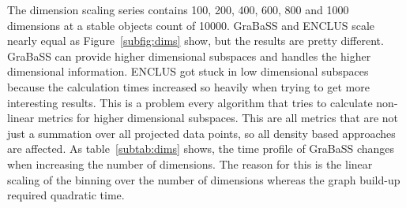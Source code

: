 \begin{table}
\end{table}

The dimension scaling series contains \num{100}, \num{200}, \num{400}, \num{600}, \num{800} and \num{1000} dimensions at a stable objects count of \num{10000}. GraBaSS and ENCLUS scale nearly equal as Figure~\ref{subfig:dims} show, but the results are pretty different. GraBaSS can provide higher dimensional subspaces and handles the higher dimensional information. ENCLUS got stuck in low dimensional subspaces because the calculation times increased so heavily when trying to get more interesting results. This is a problem every algorithm that tries to calculate non-linear metrics for higher dimensional subspaces. This are all metrics that are not just a summation over all projected data points, so all density based approaches are affected. As table~\ref{subtab:dims} shows, the time profile of GraBaSS changes when increasing the number of dimensions. The reason for this is the linear scaling of the binning over the number of dimensions whereas the graph build-up required quadratic time.

